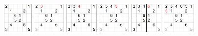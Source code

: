 \documentclass[
a4paper,     %
12pt         %
]{scrartcl}  %
\begin{document}
\begin{figure}[h!btp]
   \centering   
   \begin{minipage}[h]{1.62cm}
       \includegraphics[height=1.55cm]{imgs/backtracking1.png}  
       \subcaption{}
     \end{minipage}
     \begin{minipage}[h]{1.63cm}
       \includegraphics[height=1.55cm]{imgs/backtracking2.png}
       \subcaption{}
     \end{minipage}
     \begin{minipage}[h]{1.62cm}
       \includegraphics[height=1.55cm]{imgs/backtracking3.png}
       \subcaption{}
     \end{minipage}
     \begin{minipage}[h]{1.62cm}
       \includegraphics[height=1.55cm]{imgs/backtracking4.png}
       \subcaption{}
     \end{minipage}
     \begin{minipage}[h]{1.62cm}
       \includegraphics[height=1.55cm]{imgs/backtracking5.png}
       \subcaption{}
     \end{minipage}
     \begin{minipage}[h]{1.63cm}
       \includegraphics[height=1.55cm]{imgs/backtracking6.png}
       \subcaption{}
     \end{minipage}

\end{figure}
\end{document}
